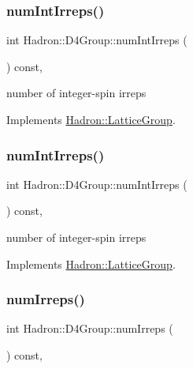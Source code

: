 \subsubsection{\texorpdfstring{numIntIrreps()}{numIntIrreps()}\hspace{0.1cm}{\footnotesize\ttfamily [2/3]}}
{\footnotesize\ttfamily int Hadron\+::\+D4\+Group\+::num\+Int\+Irreps (\begin{DoxyParamCaption}{ }\end{DoxyParamCaption}) const\hspace{0.3cm}{\ttfamily [inline]}, {\ttfamily [virtual]}}

number of integer-\/spin irreps 

Implements \mbox{\hyperlink{structHadron_1_1LatticeGroup_af2aa7b39222bf188389356eefcef7547}{Hadron\+::\+Lattice\+Group}}.

\mbox{\label{structHadron_1_1D4Group_a814de4e3ea523397868aee44d639c5cf}} 
\subsubsection{\texorpdfstring{numIntIrreps()}{numIntIrreps()}\hspace{0.1cm}{\footnotesize\ttfamily [3/3]}}
{\footnotesize\ttfamily int Hadron\+::\+D4\+Group\+::num\+Int\+Irreps (\begin{DoxyParamCaption}{ }\end{DoxyParamCaption}) const\hspace{0.3cm}{\ttfamily [inline]}, {\ttfamily [virtual]}}

number of integer-\/spin irreps 

Implements \mbox{\hyperlink{structHadron_1_1LatticeGroup_af2aa7b39222bf188389356eefcef7547}{Hadron\+::\+Lattice\+Group}}.

\mbox{\label{structHadron_1_1D4Group_ae8b007038fb1aa79a7267feebf356d4c}} 
\subsubsection{\texorpdfstring{numIrreps()}{numIrreps()}\hspace{0.1cm}{\footnotesize\ttfamily [1/3]}}
{\footnotesize\ttfamily int Hadron\+::\+D4\+Group\+::num\+Irreps (\begin{DoxyParamCaption}{ }\end{DoxyParamCaption}) const\hspace{0.3cm}{\ttfamily [inline]}, {\ttfamily [virtual]}}

